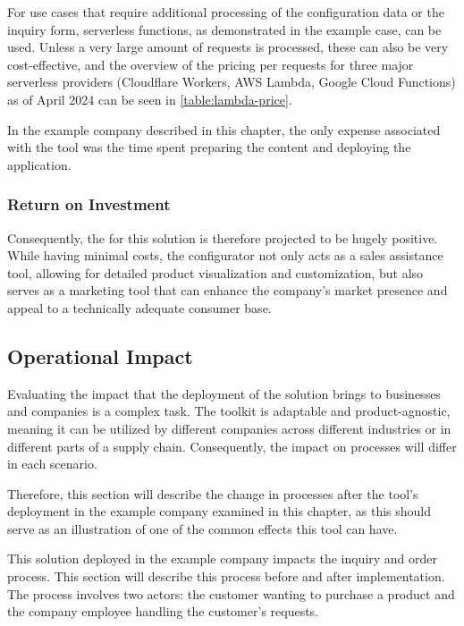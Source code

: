 For use cases that require additional processing of the configuration data or the inquiry form, serverless functions, as demonstrated in the example case, can be used. Unless a very large amount of requests is processed, these can also be very cost-effective, and the overview of the pricing per requests for three major serverless providers (Cloudflare Workers, AWS Lambda, Google Cloud Functions) as of April 2024 can be seen in \autoref{table:lambda-price}.


In the example company described in this chapter, the only expense associated with the tool was the time spent preparing the content and deploying the application.


\subsubsection{Return on Investment}

Consequently, the  for this solution is therefore projected to be hugely positive. While having minimal costs, the configurator not only acts as a sales assistance tool, allowing for detailed product visualization and customization, but also serves as a marketing tool that can enhance the company's market presence and appeal to a technically adequate consumer base. 


\subsection{Operational Impact}

Evaluating the impact that the deployment of the solution brings to businesses and companies is a complex task. The toolkit is adaptable and product-agnostic, meaning it can be utilized by different companies across different industries or in different parts of a supply chain. Consequently, the impact on processes will differ in each scenario.

Therefore, this section will describe the change in processes after the tool's deployment in the example company examined in this chapter, as this should serve as an illustration of one of the common effects this tool can have.

This solution deployed in the example company impacts the inquiry and order process. This section will describe this process before and after implementation. The process involves two actors: the customer wanting to purchase a product and the company employee handling the customer's requests.

